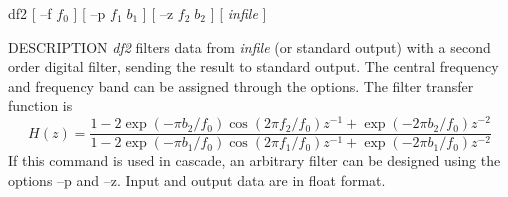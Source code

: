 % 
% 
% 
% 
%                                                                        
%
\hypertarget{df2}{}

\begin{synopsis}
 \item[df2] [ --f $f_0$ ] [ --p $f_1 \; b_1$ ] [ --z $f_2 \; b_2$ ] 
	    [ {\em infile} ]
\end{synopsis}

\begin{qsection}{DESCRIPTION}
{\em df2} filters data from {\em infile} (or standard output) 
with a second order digital filter, 
sending the result to standard output.
The central frequency and frequency band can
  be assigned through the options.
  The filter transfer function is
  \begin{displaymath}
   H(z)=\frac{1-2\exp(-\pi b_2/f_0)\cos(2\pi f_2/f_0)z^{-1} +
	\exp(-2\pi b_2/f_0)z^{-2}}
   {1-2\exp(-\pi b_1/f_0)\cos(2\pi f_1/f_0)z^{-1}+\exp(-2\pi b_1/f_0)z^{-2}}
  \end{displaymath}
 If this command is used in cascade, an arbitrary filter can be
 designed using the options --p and --z.
 Input and output data are in float format.
\end{qsection}

